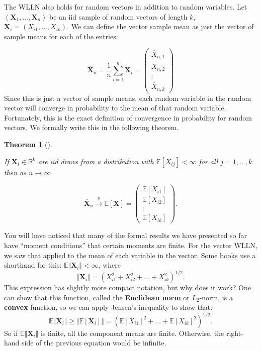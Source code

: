 \documentclass[
  letterpaper,
  DIV=11,
  numbers=noendperiod]{scrreprt}
\newcommand{\mb}{\symbf}
\newcommand{\E}{\mathbb{E}}
\newcommand{\Xbar}{\overline{X}}
\newcommand{\X}{\mb{X}}
\newcommand{\inprob}{\overset{p}{\to}}
\theoremstyle{definition}
\theoremstyle{definition}
\theoremstyle{plain}
\newtheorem{theorem}{Theorem}[chapter]
\theoremstyle{remark}
\begin{document}
The WLLN also holds for random vectors in addition to random variables.
Let \((\X_1, \ldots, \X_n)\) be an iid sample of random vectors of
length \(k\), \(\mb{X}_i = (X_{i1}, \ldots, X_{ik})\). We can define the
vector sample mean as just the vector of sample means for each of the
entries:

\[
\overline{\mb{X}}_n = \frac{1}{n} \sum_{i=1}^n \mb{X}_i =
\begin{pmatrix}
\Xbar_{n,1} \\ \Xbar_{n,2} \\ \vdots \\ \Xbar_{n, k}
\end{pmatrix}
\] Since this is just a vector of sample means, each random variable in
the random vector will converge in probability to the mean of that
random variable. Fortunately, this is the exact definition of
convergence in probability for random vectors. We formally write this in
the following theorem.

\begin{theorem}[]\protect\hypertarget{thm-vector-wlln}{}\label{thm-vector-wlln}

If \(\X_i \in \mathbb{R}^k\) are iid draws from a distribution with
\(\E[X_{ij}] < \infty\) for all \(j=1,\ldots,k\) then as
\(n\rightarrow\infty\)

\[
\overline{\mb{X}}_n \inprob \E[\X] =
\begin{pmatrix}
\E[X_{i1}] \\ \E[X_{i2}] \\ \vdots \\ \E[X_{ik}]
\end{pmatrix}.
\]

\end{theorem}

\begin{tcolorbox}[enhanced jigsaw, colframe=quarto-callout-note-color-frame, rightrule=.15mm, colback=white, breakable, opacityback=0, coltitle=black, opacitybacktitle=0.6, arc=.35mm, left=2mm, leftrule=.75mm, toptitle=1mm, colbacktitle=quarto-callout-note-color!10!white, titlerule=0mm, title=\textcolor{quarto-callout-note-color}{\faInfo}\hspace{0.5em}{Notation alert}, bottomrule=.15mm, bottomtitle=1mm, toprule=.15mm]

You will have noticed that many of the formal results we have presented
so far have ``moment conditions'' that certain moments are finite. For
the vector WLLN, we saw that applied to the mean of each variable in the
vector. Some books use a shorthand for this:
\(\E\Vert \X_i\Vert < \infty\), where \[
\Vert\X_i\Vert = \left(X_{i1}^2 + X_{i2}^2 + \ldots + X_{ik}^2\right)^{1/2}. 
\] This expression has slightly more compact notation, but why does it
work? One can show that this function, called the \textbf{Euclidean
norm} or \(L_2\)-norm, is a \textbf{convex} function, so we can apply
Jensen's inequality to show that: \[
\E\Vert \X_i\Vert \geq \Vert \E[\X_i] \Vert = (\E[X_{i1}]^2 + \ldots + \E[X_{ik}]^2)^{1/2}.
\] So if \(\E\Vert \X_i\Vert\) is finite, all the component means are
finite. Otherwise, the right-hand side of the previous equation would be
infinite.

\end{tcolorbox}
\end{document}
